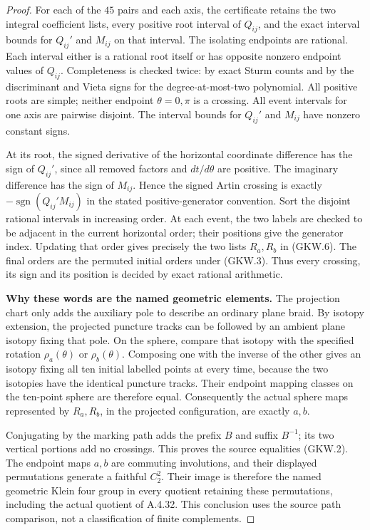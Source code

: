 \begin{proof}
For each of the $45$ pairs and each axis, the certificate
retains the two integral coefficient lists, every
positive root interval of $Q_{ij}$, and the exact
interval bounds for $Q_{ij}'$ and $M_{ij}$ on that
interval.  The isolating endpoints are rational.
Each interval either is a rational root itself or has
opposite nonzero endpoint values of $Q_{ij}$.
Completeness is checked twice: by exact Sturm counts
and by the discriminant and Vieta signs for the
degree-at-most-two polynomial.
All positive roots are simple; neither endpoint
$\theta=0,\pi$ is a crossing.  All event intervals for
one axis are pairwise disjoint.
The interval bounds for $Q_{ij}'$ and $M_{ij}$ have
nonzero constant signs.

At its root, the signed derivative of the horizontal
coordinate difference has the sign of $Q_{ij}'$,
since all removed factors and $dt/d\theta$ are
positive.  The imaginary difference has the sign of
$M_{ij}$.  Hence the signed Artin crossing is exactly
$-\operatorname{sgn}(Q_{ij}'M_{ij})$ in the stated
positive-generator convention.
Sort the disjoint rational intervals in increasing
order.  At each event, the two labels are checked
to be adjacent in the current horizontal order;
their positions give the generator index.
Updating that order gives precisely the two lists
$R_a,R_b$ in (GKW.6).  The final orders are the
permuted initial orders under (GKW.3).
Thus every crossing, its sign and its position is
decided by exact rational arithmetic.

\par\medskip\noindent\textbf{Why these words are the named geometric elements.}\quad
The projection chart only adds the auxiliary pole to
describe an ordinary plane braid.  By isotopy extension,
the projected puncture tracks can be followed by an
ambient plane isotopy fixing that pole.  On the sphere,
compare that isotopy with the specified rotation
$\rho_a(\theta)$ or $\rho_b(\theta)$.
Composing one with the inverse of the other gives an
isotopy fixing all ten initial labelled points at every
time, because the two isotopies have the identical
puncture tracks.  Their endpoint mapping classes on the
ten-point sphere are therefore equal.
Consequently the actual sphere maps represented by
$R_a,R_b$, in the projected configuration, are exactly
$a,b$.

Conjugating by the marking path adds the prefix $B$
and suffix $B^{-1}$; its two vertical portions add no
crossings.  This proves the source equalities (GKW.2).
The endpoint maps $a,b$ are commuting involutions, and
their displayed permutations generate a faithful
$C_2^2$.  Their image is therefore the named geometric
Klein four group in every quotient retaining these
permutations, including the actual quotient of A.4.32.
This conclusion uses the source path comparison,
not a classification of finite complements.


\end{proof}
